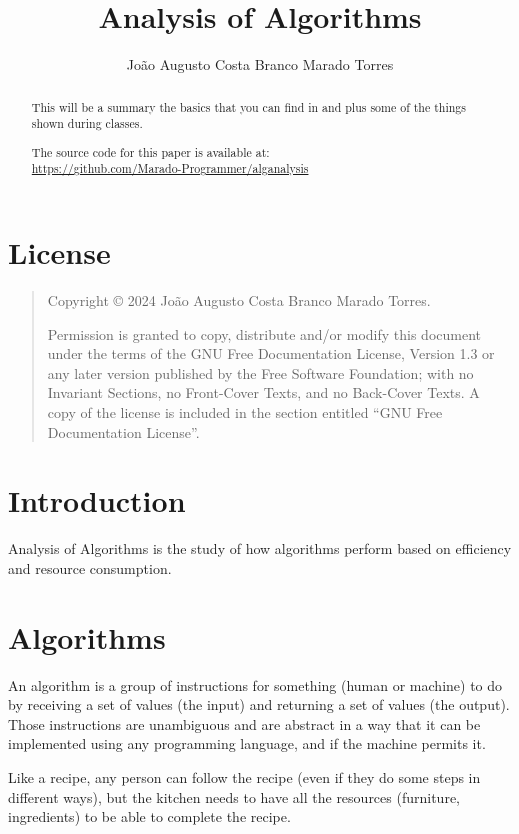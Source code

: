 \documentclass[a4paper,12pt]{article}
\title{Analysis of Algorithms}
\author{João Augusto Costa Branco Marado Torres}
\newcommand{\copyrightnotice}{
    Copyright \copyright{}  2024  João Augusto Costa Branco Marado Torres.
}
\newcommand{\licensenotice}{
    \copyrightnotice
    Permission is granted to copy, distribute and/or modify this document
    under the terms of the GNU Free Documentation License, Version 1.3
    or any later version published by the Free Software Foundation;
    with no Invariant Sections, no Front-Cover Texts, and no Back-Cover Texts.
    A copy of the license is included in the section entitled ``GNU
    Free Documentation License''.
}
\theoremstyle{mytheoremstyle}
\theoremstyle{mytheoremstyle}
\theoremstyle{myproblemstyle}
\begin{document}
    \maketitle

    \begin{abstract}
        This will be a summary the basics that you can find in 
        \cite{algs} and  \cite{designanalysis} plus
        some of the things shown during classes.

        The source code for this paper is available at: \\
        \url{https://github.com/Marado-Programmer/alganalysis} \cite{repo}
    \end{abstract}

    \section*{License}

    \bigskip
    \begin{quote}
        \licensenotice
    \end{quote}
    \bigskip

    \tableofcontents

    \lstlistoflistings
    \clearpage

    \section{Introduction}

    Analysis of Algorithms is the study of how algorithms perform based on
    efficiency and resource consumption.

    \section{Algorithms}

    An algorithm is a group of instructions for something (human or machine) to
    do by receiving a set of values (the input) and returning a set of values
    (the output). Those instructions are unambiguous and are abstract in a way
    that it can be implemented using any programming language, and if the
    machine permits it.

    Like a recipe, any person can follow the recipe (even if they do some steps
    in different ways), but the kitchen needs to have all the resources
    (furniture, ingredients) to be able to complete the recipe.
\end{document}

